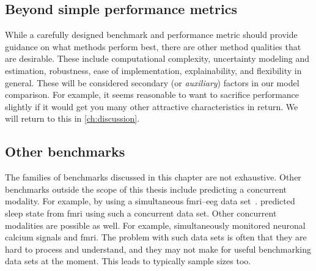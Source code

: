 \subsection{Beyond simple performance metrics}

While a carefully designed benchmark and performance metric should provide guidance on what methods perform best, there are other method qualities that are desirable.
%
These include computational complexity, uncertainty modeling and estimation, robustness, ease of implementation, explainability, and flexibility in general.
%
These will be considered secondary (or \emph{auxiliary}) factors in our model comparison.
For example, it seems reasonable to want to sacrifice performance slightly if it would get you many other attractive characteristics in return.
%
We will return to this in \cref{ch:discussion}.

\subsection{Other benchmarks}

The families of benchmarks discussed in this chapter are not exhaustive.
%
Other benchmarks outside the scope of this thesis include predicting a concurrent modality.
For example, by using a simultaneous \gls{fmri}--\gls{eeg} data set~\parencite{Laufs2003}.
\textcite{Tagliazucchi2014} predicted sleep state from \gls{fmri} using such a concurrent data set.
Other concurrent modalities are possible as well.
For example, \textcite{Matsui2016} simultaneously monitored neuronal calcium signals and \gls{fmri}.
%
The problem with such data sets is often that they are hard to process and understand, and they may not make for useful benchmarking data sets at the moment.
This leads to typically sample sizes too.
